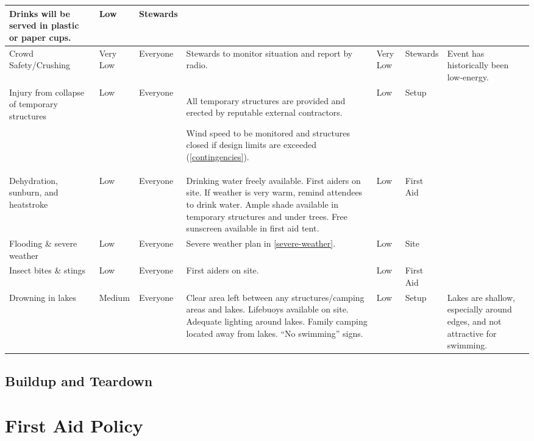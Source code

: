\begin{landscape}
\begin{table}[h!]
\begin{tabular}{| p{3cm} | l | p{1.5cm} | p{9cm} | p{1.5cm} | p{2cm} | p{5cm} |}
Drinks will be served in plastic or paper cups. &
Low & Stewards & \\ \hline

Crowd Safety/Crushing & Very Low & Everyone &
Stewards to monitor situation and report by radio. &
Very Low & Stewards & Event has historically been low-energy. \\ \hline

Injury from collapse of temporary structures & Low & Everyone &
All temporary structures are provided and erected by reputable external contractors.

Wind speed to be monitored and structures closed if design limits are exceeded (\cref{contingencies}). &
Low & Setup & \\ \hline

Dehydration, sunburn, and heatstroke & Low & Everyone &
Drinking water freely available.
First aiders on site. 
If weather is very warm, remind attendees to drink water.
Ample shade available in temporary structures and under trees.
Free sunscreen available in first aid tent.
& Low & First Aid & \\ \hline

Flooding \& severe weather & Low & Everyone &
Severe weather plan in \cref{severe-weather}. & Low & Site & \\ \hline

Insect bites \& stings & Low & Everyone &
First aiders on site. & Low & First Aid & \\ \hline

Drowning in lakes & Medium & Everyone &
Clear area left between any structures/camping areas and lakes. 
Lifebuoys available on site. Adequate lighting around lakes.
Family camping located away from lakes. ``No swimming'' signs.
& Low & Setup & 
Lakes are shallow, especially around edges, and not attractive for
swimming.
\\ \hline

\end{tabular}
\end{table}
\newpage
\thispagestyle{empty}
\subsection{Buildup and Teardown}


\end{landscape}
\restoregeometry

\appendix

\section{First Aid Policy}
\label{first-aid-policy}

\newpage

